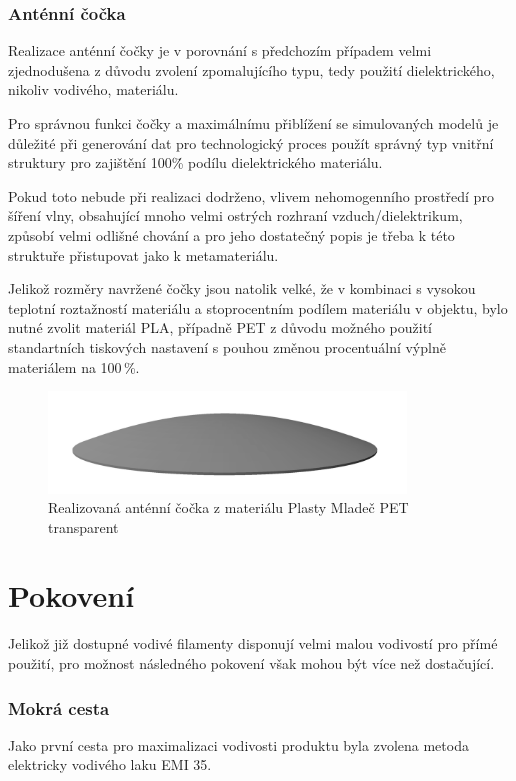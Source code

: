 \subsubsection{Anténní čočka}
Realizace anténní čočky je v porovnání s předchozím případem velmi zjednodušena z důvodu zvolení zpomalujícího typu, tedy použití dielektrického, nikoliv vodivého, materiálu.

Pro správnou funkci čočky a maximálnímu přiblížení se simulovaných modelů je důležité při generování dat pro technologický proces použít správný typ vnitřní struktury pro zajištění 100\.\% podílu dielektrického materiálu.

Pokud toto nebude při realizaci dodrženo, vlivem nehomogenního prostředí pro šíření vlny, obsahující mnoho velmi ostrých rozhraní vzduch/dielektrikum, způsobí velmi odlišné chování a pro jeho dostatečný popis je třeba k této struktuře přistupovat jako k metamateriálu.

Jelikož rozměry navržené čočky jsou natolik velké, že v kombinaci s vysokou teplotní roztažností materiálu a stoprocentním podílem materiálu v objektu, bylo nutné zvolit materiál PLA, případně PET z důvodu možného použití standartních tiskových nastavení s pouhou změnou procentuální výplně materiálem na 100\,\%.

\begin{figure}[h]
\begin{center}
\includegraphics[width=9.5cm]{pics/LensModel}
\caption{Realizovaná anténní čočka z materiálu Plasty Mladeč PET transparent}
\label{fig:LensReal}
\end{center}
\end{figure}

\section{Pokovení}
Jelikož již dostupné vodivé filamenty disponují velmi malou vodivostí pro přímé použití, pro možnost následného pokovení však mohou být více než dostačující.

\subsubsection{Mokrá cesta}
Jako první cesta pro maximalizaci vodivosti produktu byla zvolena metoda elektricky vodivého laku EMI 35\cite{EMIdata}.


